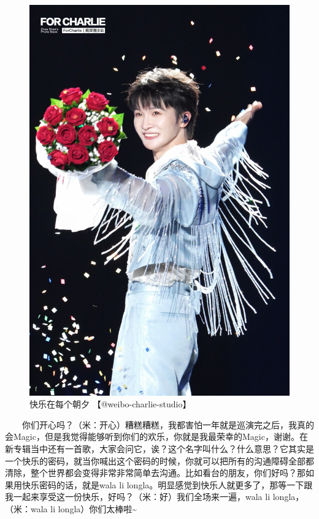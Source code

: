 \documentclass[]{ctexbook}
\begin{document}
\begin{figure}

{\centering \includegraphics[width=450pt]{img/nanjing20240811/001} 

}

\caption{快乐在每个朝夕 【@weibo-charlie-studio】}\label{fig:unnamed-chunk-78}
\end{figure}

  你们开心吗？（米：开心）糟糕糟糕，我都害怕一年就是巡演完之后，我真的会Magic，但是我觉得能够听到你们的欢乐，你就是我最荣幸的Magic，谢谢。在新专辑当中还有一首歌，大家会问它，诶？这个名字叫什么？什么意思？它其实是一个快乐的密码，就当你喊出这个密码的时候，你就可以把所有的沟通障碍全部都清除，整个世界都会变得非常非常简单去沟通。比如看台的朋友，你们好吗？那如果用快乐密码的话，就是wala li longla。明显感觉到快乐人就更多了，那等一下跟我一起来享受这一份快乐，好吗？（米：好）我们全场来一遍，wala li longla，（米：wala li longla）你们太棒啦\textasciitilde{}
\end{document}
